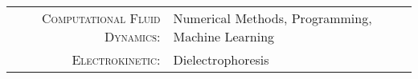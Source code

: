 \begin{tabular}{rl}
   \textsc{Computational Fluid Dynamics:} & Numerical Methods, Programming, Machine Learning \\
   \textsc{Electrokinetic:} & Dielectrophoresis \\
\end{tabular}

